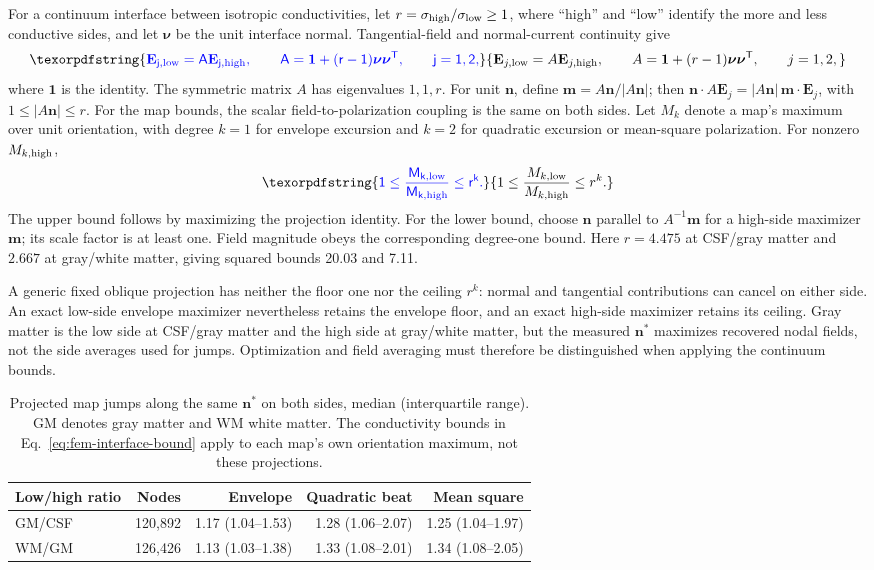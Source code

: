 \documentclass[11pt,a4paper]{article}
\providecommand{\DIFaddtex}[1]{{\protect\color{blue} \sf #1}} %
\providecommand{\DIFadd}[1]{\texorpdfstring{\DIFaddtex{#1}}{#1}} %
\begin{document}
\DIFadd{For a continuum interface between isotropic conductivities, let
$r=\sigma_{\rm high}/\sigma_{\rm low}\geq1$, where ``high'' and ``low''
identify the more and less conductive sides, and let $\boldsymbol\nu$ be
the unit interface normal. Tangential-field and normal-current continuity give
}\begin{equation}
\DIFadd{\mathbf E_{j,\rm low}=A\mathbf E_{j,\rm high},\qquad
A=\mathbf 1+(r-1)\boldsymbol\nu\boldsymbol\nu^{\mathsf T},\qquad j=1,2,
\label{eq:fem-interface-transform}
}\end{equation}
\DIFadd{where $\mathbf 1$ is the identity. The symmetric matrix $A$ has eigenvalues
$1,1,r$. For unit $\mathbf n$, define
$\mathbf m=A\mathbf n/|A\mathbf n|$; then
$\mathbf n\cdot A\mathbf E_j=|A\mathbf n|\,\mathbf m\cdot\mathbf E_j$,
with $1\leq|A\mathbf n|\leq r$.
For the map bounds, the scalar field-to-polarization coupling is the same
on both sides. Let $M_k$ denote a map's maximum over unit orientation, with degree $k=1$
for envelope excursion and $k=2$ for quadratic excursion or mean-square
polarization. For nonzero $M_{k,\rm high}$,
}\begin{equation}
\DIFadd{1\leq\frac{M_{k,\rm low}}{M_{k,\rm high}}\leq r^k.
\label{eq:fem-interface-bound}
}\end{equation}
\DIFadd{The upper bound follows by maximizing the projection identity. For the lower
bound, choose $\mathbf n$ parallel to $A^{-1}\mathbf m$ for a high-side
maximizer $\mathbf m$; its scale factor is at least one. Field magnitude
obeys the corresponding degree-one bound. Here $r=4.475$ at CSF/gray matter
and $2.667$ at gray/white matter, giving squared bounds 20.03 and 7.11.
}

\DIFadd{A generic fixed oblique projection has neither the floor one nor the ceiling
$r^k$: normal and tangential contributions can cancel on either side.
An exact low-side envelope maximizer nevertheless retains the envelope floor,
and an exact high-side maximizer retains its ceiling. Gray matter is the
low side at CSF/gray matter and the high side at gray/white matter, but the
measured $\mathbf n^*$ maximizes recovered nodal fields, not the side averages
used for jumps. Optimization and field averaging must therefore be
distinguished when applying the continuum bounds.
}

\begin{table}[htbp]
\color{blue}
\centering\small
\begin{tabular}{@{}lrrrr@{}}
\toprule
Low/high ratio & Nodes & Envelope & Quadratic beat & Mean square\\
\midrule
GM/CSF & 120,892 & 1.17 (1.04--1.53) & 1.28 (1.06--2.07) & 1.25 (1.04--1.97)\\
WM/GM & 126,426 & 1.13 (1.03--1.38) & 1.33 (1.08--2.01) & 1.34 (1.08--2.05)\\
\bottomrule
\end{tabular}
\caption{\color{blue}Projected map jumps along the same $\mathbf n^*$ on both sides,
median (interquartile range). GM denotes gray matter and WM white matter.
The conductivity bounds in Eq.~\eqref{eq:fem-interface-bound} apply to
each map's own orientation maximum, not these projections.}
\label{tab:fem-interface-jumps}
\end{table}
\end{document}
